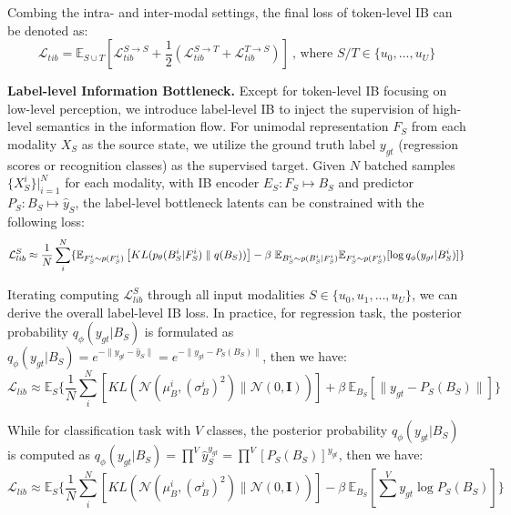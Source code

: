 \documentclass{article}
\begin{document}
Combing the intra- and inter-modal settings, the final loss of token-level IB can be denoted as:
\begin{equation}
    \mathcal{L}_{tib} =  \mathbb{E}_{S\cup T}[\mathcal{L}^{S\rightarrow S}_{tib} + \frac{1}{2}(\mathcal{L}^{S\rightarrow T}_{tib} + \mathcal{L}^{T\rightarrow S}_{tib})] \ \text{, where } S/T\in\{u_0,...,u_U\} 
\label{equ_token_ib_final}
\end{equation}

\textbf{Label-level Information Bottleneck.} Except for token-level IB focusing on low-level perception, we introduce label-level IB to inject the supervision of high-level semantics in the information flow. For unimodal representation $F_S$ from each modality $X_S$ as the source state, we utilize the ground truth label $y_{gt}$ (regression scores or recognition classes) as the supervised target. Given $N$ batched samples $\{X^i_S\}|_{i=1}^{N}$ for each modality, with IB encoder $E_S:F_S\mapsto B_S$ and predictor $P_S:B_S\mapsto \hat{y}_S$, the label-level bottleneck latents can be constrained with the following loss:
\begin{equation}
    \small{\mathcal{L}^{S}_{lib} \approx \frac{1}{N}\sum^N_{i} \{\mathbb{E}_{F^i_S\sim p(F^i_S)}\left[ KL( p_\theta(B^i_S|F^i_S)\parallel q(B_S))\right] - \beta\ \mathbb{E}_{B^i_S\sim p(B^i_S|F^i_S)}\mathbb{E}_{F^i_S\sim p(F^i_S)} [\log q_\phi(y_{gt}|B^i_S)] \}}
\label{equ_label_ib1}
\end{equation}

Iterating computing $\mathcal{L}^{S}_{lib}$ through all input modalities $S\in\{u_0,u_1,...,u_U\}$, we can derive the overall label-level IB loss. In practice, for regression task, the posterior probability $q_\phi(y_{gt}|B_S)$ is formulated as $q_\phi(y_{gt}|B_S)=e^{-\parallel y_{gt}-\hat{y}_S\parallel}=e^{-\parallel y_{gt}-P_S(B_S)\parallel}$, then we have:
\begin{equation}
    \mathcal{L}_{lib} \approx \mathbb{E}_{S}\{\frac{1}{N}\sum^N_{i} \left[KL( \mathcal{N}(\mu^i_B, (\sigma_B^{i})^2)\parallel\mathcal{N}(0,\textbf{I}))\right] + \beta\ \mathbb{E}_{B_S} [\parallel y_{gt}-P_S(B_S)\parallel]\}
\label{equ_label_ib_final1}
\end{equation}

While for classification task with $V$ classes, the posterior probability $q_\phi(y_{gt}|B_S)$ is computed as $q_\phi(y_{gt}|B_S)=\prod^V \hat{y}_S^{y_{gt}}=\prod ^V[P_S(B_S)]^{y_{gt}}$, then we have:
\begin{equation}
    \mathcal{L}_{lib} \approx \mathbb{E}_{S}\{\frac{1}{N}\sum^N_{i} \left[KL( \mathcal{N}(\mu^i_B, (\sigma_B^{i})^2)\parallel\mathcal{N}(0,\textbf{I}))\right] - \beta\ \mathbb{E}_{B_S} [\sum^V y_{gt}\log{P_S(B_S)}]\}
\label{equ_label_ib_final2}
\end{equation}
\end{document}
